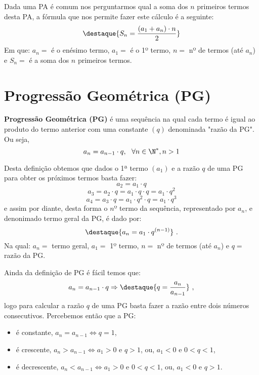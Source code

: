  Dada uma PA é comum nos perguntarmos qual a soma dos $n$ primeiros termos desta PA, a fórmula que nos permite fazer este cálculo é a seguinte:
 \[\destaque{S_n= \frac{(a_1 + a_n)\cdot n}{2}}\]
 Em que: $a_n=$ é o enésimo termo, $a_1=$ é o 1º termo, $n=$ nº de termos (até $a_n$) e $S_n=$ é a soma dos $n$ primeiros termos.



\section{Progressão Geométrica (PG)}

 \colorbox{azul}{
 \begin{minipage}{14.5cm}
 \begin{center}
  \textbf{Progressão Geométrica (PG)} é uma sequência na qual cada termo é igual ao produto do termo anterior com uma constante $(q)$ denominada "razão da PG". Ou seja,
  \[a_{n}= a_{n-1} \cdot q, \ \ \forall n \in \N^{\ast}, n > 1\]
 \end{center}
 \end{minipage}}
 \vskip0.3cm

 Desta definição obtemos que dados o 1ª termo $(a_1)$ e a razão $q$ de uma PG para obter os próximos termos basta fazer:
 \[a_2= a_1 \cdot q\]
 \[a_3= a_2 \cdot q= a_1 \cdot q \cdot q= a_1 \cdot q^2\]
 \[a_4= a_3 \cdot q= a_1 \cdot q^2 \cdot q= a_1 \cdot q^3 \]
 e assim por diante, desta forma o $nº$ termo da sequência, representado por $a_n$, e denonimado termo geral da PG, é dado por:
 \[\destaque{a_n= a_1 \cdot q^{(n-1)}} \ .\]
 Na qual: $a_n=$ termo geral, $a_1=$ 1º termo, $n=$ nº de termos (até $a_n$) e $q=$ razão da PG.

 Ainda da definição de PG é fácil temos que:
 \[a_{n}= a_{n-1} \cdot q \Rightarrow
 \destaque{q= \frac{a_{n}}{ a_{n-1}}} \ ,\]
 logo para calcular a razão $q$ de uma PG basta fazer a razão entre dois números consecutivos. Percebemos então que a PG:
 \begin{itemize}
  \item é constante, $a_n= a_{n-1} \Leftrightarrow q= 1$,
  \item é crescente, $a_n > a_{n-1} \Leftrightarrow a_1 > 0$ e $q > 1$, ou, $a_1 < 0$ e $0 < q < 1$,
  \item é decrescente, $a_n < a_{n-1} \Leftrightarrow a_1 > 0$ e $0 < q < 1$, ou, $a_1 < 0$ e $q > 1$.
 \end{itemize}

